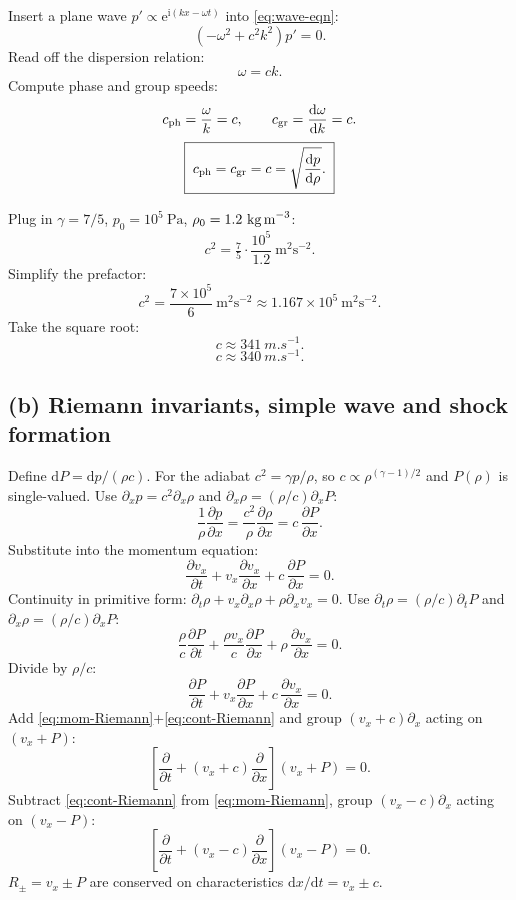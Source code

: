 \documentclass[11pt]{article}
\newcommand{\de}{\mathrm{d}}
\newcommand{\pd}[2]{\frac{\partial #1}{\partial #2}}
\begin{document}
Insert a plane wave $p'\propto\mathrm{e}^{\mathrm{i}(kx-\omega t)}$ into \eqref{eq:wave-eqn}:
\[ (-\omega^2 + c^2 k^2)p' = 0. \]
Read off the dispersion relation:
\[ \omega = ck. \]
Compute phase and group speeds:
\[ c_\text{ph} = \frac{\omega}{k} = c,\qquad c_\text{gr} = \dv{\omega}{k} = c. \]
\begin{equation}
\boxed{\;c_\text{ph}=c_\text{gr}=c=\sqrt{\dv{p}{\rho}}.\;}
\end{equation}

Plug in $\gamma=7/5$, $p_0=10^5~\text{Pa}$, $\rho_0=1.2~\text{kg\,m}^{-3}$:
\[ c^2 = \tfrac{7}{5}\cdot\frac{10^5}{1.2}~\text{m}^2\text{s}^{-2}. \]
Simplify the prefactor:
\[ c^2 = \frac{7\times 10^5}{6}~\text{m}^2\text{s}^{-2} \approx 1.167\times 10^5~\text{m}^2\text{s}^{-2}. \]
Take the square root:
\[ c \approx \SI{341}{m.s^{-1}}. \]
\begin{equation}
\boxed{\;c \approx \SI{340}{m.s^{-1}}.\;}
\end{equation}

\subsection*{(b) Riemann invariants, simple wave and shock formation}

Define $\de P = \de p/(\rho c)$. For the adiabat $c^2=\gamma p/\rho$, so $c\propto\rho^{(\gamma-1)/2}$ and $P(\rho)$ is single-valued. Use $\partial_x p = c^2\partial_x\rho$ and $\partial_x\rho = (\rho/c)\partial_x P$:
\[ \frac{1}{\rho}\pd{p}{x} = \frac{c^2}{\rho}\pd{\rho}{x} = c\,\pd{P}{x}. \]
Substitute into the momentum equation:
\begin{equation}
\pd{v_x}{t} + v_x\pd{v_x}{x} + c\,\pd{P}{x} = 0.
\label{eq:mom-Riemann}
\end{equation}
Continuity in primitive form: $\partial_t\rho+v_x\partial_x\rho+\rho\partial_x v_x=0$. Use $\partial_t\rho=(\rho/c)\partial_t P$ and $\partial_x\rho=(\rho/c)\partial_x P$:
\[ \frac{\rho}{c}\pd{P}{t} + \frac{\rho v_x}{c}\pd{P}{x} + \rho\,\pd{v_x}{x} = 0. \]
Divide by $\rho/c$:
\begin{equation}
\pd{P}{t} + v_x\pd{P}{x} + c\,\pd{v_x}{x} = 0.
\label{eq:cont-Riemann}
\end{equation}
Add \eqref{eq:mom-Riemann}+\eqref{eq:cont-Riemann} and group $(v_x+c)\partial_x$ acting on $(v_x+P)$:
\begin{equation}
\boxed{\;\!\left[\pd{}{t}+(v_x+c)\pd{}{x}\right](v_x+P) = 0.\;}
\label{eq:Rplus}
\end{equation}
Subtract \eqref{eq:cont-Riemann} from \eqref{eq:mom-Riemann}, group $(v_x-c)\partial_x$ acting on $(v_x-P)$:
\begin{equation}
\boxed{\;\!\left[\pd{}{t}+(v_x-c)\pd{}{x}\right](v_x-P) = 0.\;}
\label{eq:Rminus}
\end{equation}
$R_\pm = v_x\pm P$ are conserved on characteristics $\de x/\de t = v_x\pm c$.
\end{document}
